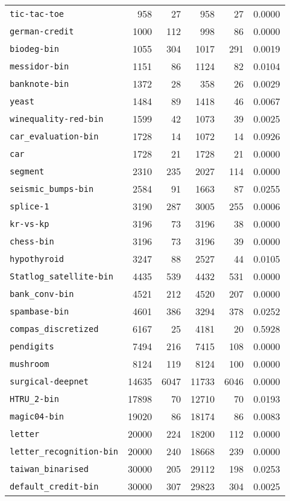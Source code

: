 \begin{tabular}{lrrrrr}
\texttt{tic-tac-toe}& 958& 27& 958& 27& 0.0000\\
\texttt{german-credit}& 1000& 112& 998& 86& 0.0000\\
\texttt{biodeg-bin}& 1055& 304& 1017& 291& 0.0019\\
\texttt{messidor-bin}& 1151& 86& 1124& 82& 0.0104\\
\texttt{banknote-bin}& 1372& 28& 358& 26& 0.0029\\
\texttt{yeast}& 1484& 89& 1418& 46& 0.0067\\
\texttt{winequality-red-bin}& 1599& 42& 1073& 39& 0.0025\\
\texttt{car\_evaluation-bin}& 1728& 14& 1072& 14& 0.0926\\
\texttt{car}& 1728& 21& 1728& 21& 0.0000\\
\texttt{segment}& 2310& 235& 2027& 114& 0.0000\\
\texttt{seismic\_bumps-bin}& 2584& 91& 1663& 87& 0.0255\\
\texttt{splice-1}& 3190& 287& 3005& 255& 0.0006\\
\texttt{kr-vs-kp}& 3196& 73& 3196& 38& 0.0000\\
\texttt{chess-bin}& 3196& 73& 3196& 39& 0.0000\\
\texttt{hypothyroid}& 3247& 88& 2527& 44& 0.0105\\
\texttt{Statlog\_satellite-bin}& 4435& 539& 4432& 531& 0.0000\\
\texttt{bank\_conv-bin}& 4521& 212& 4520& 207& 0.0000\\
\texttt{spambase-bin}& 4601& 386& 3294& 378& 0.0252\\
\texttt{compas\_discretized}& 6167& 25& 4181& 20& 0.5928\\
\texttt{pendigits}& 7494& 216& 7415& 108& 0.0000\\
\texttt{mushroom}& 8124& 119& 8124& 100& 0.0000\\
\texttt{surgical-deepnet}& 14635& 6047& 11733& 6046& 0.0000\\
\texttt{HTRU\_2-bin}& 17898& 70& 12710& 70& 0.0193\\
\texttt{magic04-bin}& 19020& 86& 18174& 86& 0.0083\\
\texttt{letter}& 20000& 224& 18200& 112& 0.0000\\
\texttt{letter\_recognition-bin}& 20000& 240& 18668& 239& 0.0000\\
\texttt{taiwan\_binarised}& 30000& 205& 29112& 198& 0.0253\\
\texttt{default\_credit-bin}& 30000& 307& 29823& 304& 0.0025\\

\end{tabular}
